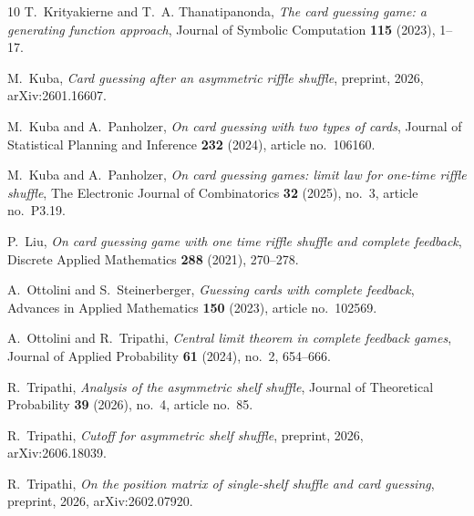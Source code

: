 \documentclass[11pt,reqno]{amsart}
\numberwithin{equation}{section}
\theoremstyle{definition}
\theoremstyle{remark}
\begin{document}
\begin{thebibliography}{10}
T.~Krityakierne and T.~A. Thanatipanonda, \emph{{The card guessing game: a
  generating function approach}}, Journal of Symbolic Computation \textbf{115}
  (2023), 1--17.

M.~Kuba, \emph{{Card guessing after an asymmetric riffle shuffle}}, preprint,
  2026, arXiv:2601.16607.

M.~Kuba and A.~Panholzer, \emph{{On card guessing with two types of cards}},
  Journal of Statistical Planning and Inference \textbf{232} (2024), article
  no.~106160.

M.~Kuba and A.~Panholzer, \emph{{On card guessing games: limit law for one-time
  riffle shuffle}}, The Electronic Journal of Combinatorics \textbf{32} (2025),
  no.~3, article no.~P3.19.

P.~Liu, \emph{{On card guessing game with one time riffle shuffle and complete
  feedback}}, Discrete Applied Mathematics \textbf{288} (2021), 270--278.

A.~Ottolini and S.~Steinerberger, \emph{{Guessing cards with complete
  feedback}}, Advances in Applied Mathematics \textbf{150} (2023), article
  no.~102569.

A.~Ottolini and R.~Tripathi, \emph{{Central limit theorem in complete feedback
  games}}, Journal of Applied Probability \textbf{61} (2024), no.~2, 654--666.

R.~Tripathi, \emph{{Analysis of the asymmetric shelf shuffle}}, Journal of
  Theoretical Probability \textbf{39} (2026), no.~4, article no.~85.

R.~Tripathi, \emph{{Cutoff for asymmetric shelf shuffle}}, preprint, 2026,
  arXiv:2606.18039.

R.~Tripathi, \emph{{On the position matrix of single-shelf shuffle and card
  guessing}}, preprint, 2026, arXiv:2602.07920.

\end{thebibliography}

\endgroup
\end{document}
